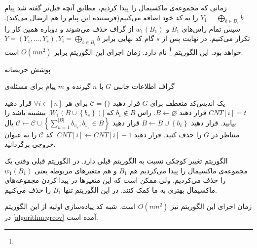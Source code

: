 زمانی که مجموعه‌ی ماکسیمال را پیدا کردیم، مطابق آنچه قبل‌تر گفته شد پیام
 $Y_1 = \bigoplus\limits_{b \in B_1} b$
 را به کد خود اضافه می‌کنیم(فرستنده این پیام را هم ارسال می‌کند). سپس تمام راس‌های
 $B_1$
 و
 $w_1(B_1)$
 از گراف حذف می‌شوند و دوباره همین کار را تکرار می‌کنیم. در نهایت پس از 
 $s$
 گام کد نهایی برابر
 $Y = (Y_1, \ldots, Y_s), Y_i =  \bigoplus\limits_{b \in B_i} b$
 خواهد بود. این الگوریتم
 \GRCOVone\footnote{}
 	نام دارد. زمان اجرای این الگوریتم برابر
 	$O(mn^2)$
 	است.
 	\begin{algorithm}
 		\caption[
 		پوشش حریصانه
 		]{
 			پوشش حریصانه
 			\cite{pliable2015paper}}
 		\label{algorithm:grcov}
 		\begin{algorithmic}[1]
 			\Require
 			گراف اطلاعات جانبی
 			$G$
 			با
 			$n$
 			گیرنده و
 			$m$
 			پیام برای مسئله‌ی
 			
 			\Ensure
 			یک اندیس‌کد منعطف برای
 			$G$
 			\State 
 			قرار دهید
 			$\mathcal{C} = \{\}$
 			\State برای هر
 			 $\forall i \in [n]$
 			 قرار دهید
 			 $CNT[i] = t$ 
		 			\State
		 			قرار دهید
		 			 $B \leftarrow \varnothing$.
				 			\State
				 			راس
				 			 $b_v \notin B$ 
				 			 که
				 			 $\left|W_1\left(B \cup\left\{b_v\right\}\right)\right|$
				 			 بیشینه باشد را بیابید.
				 			\State قرار دهید
				 			$B \leftarrow B \cup\left\{b_v\right\}$
		 			\EndWhile
		 			\State قرار دهید
		 			 $\mathcal{C} \leftarrow \mathcal{C} \cup\left\{\sum_{u=1}^{|B|} b_{v_u}, b_{v_u} \in B\right\}$
		 	\State یال متناظر در
		 	 $G$
		 	 را حذف کنید.
		 	 \EndIf
		 			\State قرار دهید $CNT[i] \leftarrow CNT[i]-1$.
		 			\EndFor
 			\EndWhile
 			\State کد
 			 $\mathcal{C}$
 			 را به عنوان خروجی برگردانید.
 		\end{algorithmic}
 	\end{algorithm}

 الگوریتم
 	تغییر کوچکی نسبت به الگوریتم قبلی دارد. در الگوریتم قبلی وقتی یک مجموعه‌ی ماکسیمال را پیدا می‌کردیم هم
 $B_1$
 و هم متغیرهای مربوطه یعنی
 $w_1(B_1)$
 را حذف می‌کردیم. ولی ممکن است که این متغیرها در پیدا کردن مجموعه‌های ماکسیمال بهتری به ما کمک کنند. در این الگوریتم تنها
 $B_1$
 را حذف می‌کنیم.
 
 زمان اجرای این الگوریتم نیز
 $O(mn^2)$
 است. شبه کد 
 پیاده‌سازی اولیه از این الگوریتم در
 \autoref{algorithm:grcov}
 آمده است.
